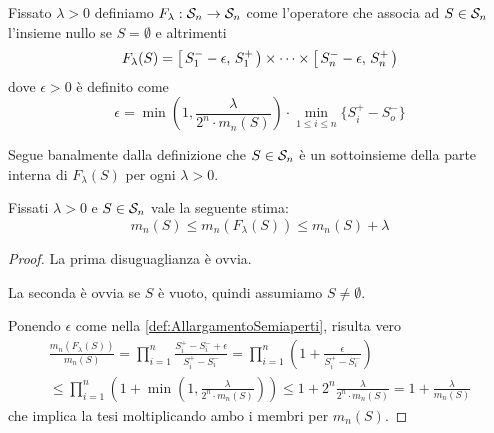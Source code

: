 \begin{definition}\label{def:AllargamentoSemiaperti}
	Fissato $\lambda>0$ definiamo $F_\lambda:\S_n\to\S_n$ come l'operatore che associa ad $S\in\S_n$ l'insieme nullo se $S=\emptyset$ e altrimenti
	\begin{equation*}
		F_\lambda(S)=\co{S^-_1-\epsilon}{S^+_1}\times\cdots\times\co{S^-_n-\epsilon}{S^+_n}
	\end{equation*}
	dove $\epsilon>0$ è definito come
	\begin{equation*}
		\epsilon=\min\left(1,\frac{\lambda}{2^n\cdot m_n(S)}\right)\cdot\min_{1\le i\le n}\{S^+_i-S^-_o\}
	\end{equation*}
\end{definition}
\begin{remark}\label{nota:ParteInternaAllargamento}
	Segue banalmente dalla definizione che $S\in\S_n$ è un sottoinsieme della parte interna di $F_\lambda(S)$ per ogni $\lambda>0$.
\end{remark}

\begin{proposition}\label{prop:MisuraAllargamento}
	Fissati $\lambda>0$ e $S\in\S_n$ vale la seguente stima:
	\begin{equation*}
		m_n(S)\le m_n(F_\lambda(S))\le m_n(S)+\lambda
	\end{equation*}
\end{proposition}
\begin{proof}
	La prima disuguaglianza è ovvia.
	
	La seconda è ovvia se $S$ è vuoto, quindi assumiamo $S\not=\emptyset$.
	
	Ponendo $\epsilon$ come nella \cref{def:AllargamentoSemiaperti}, risulta vero
	\begin{multline*}
		\frac{m_n(F_\lambda(S))}{m_n(S)}=\prod_{i=1}^n\frac{S^+_i-S^-_i+\epsilon}{S^+_i-S^-_i}=
		\prod_{i=1}^n\left(1+\frac{\epsilon}{S^+_i-S^-_i}\right)\\\le
		\prod_{i=1}^n\left(1+\min\left(1,\frac{\lambda}{2^n\cdot m_n(S)}\right)\right)\le
		1+2^n\frac{\lambda}{2^n\cdot m_n(S)}=1+\frac{\lambda}{m_n(S)}
	\end{multline*}
	che implica la tesi moltiplicando ambo i membri per $m_n(S)$.
\end{proof}

